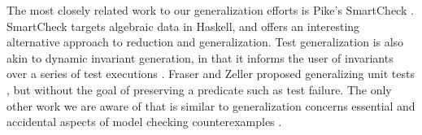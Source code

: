 The most closely related work to our generalization efforts is Pike's
SmartCheck \cite{SmartCheck}.  SmartCheck targets algebraic data in
Haskell, and offers an interesting alternative approach to reduction
and generalization.  Test generalization is also akin to dynamic invariant generation,
in that it informs the user of invariants over a series of test
executions \cite{Daikon}.  Fraser and Zeller proposed  generalizing
unit tests \cite{FraserGen}, but without the goal of preserving a
predicate such as test failure.  The only other work we are aware of that is
similar to generalization concerns essential and accidental aspects of
model checking counterexamples \cite{FreeWill,MakeMost,SPIN03}.  